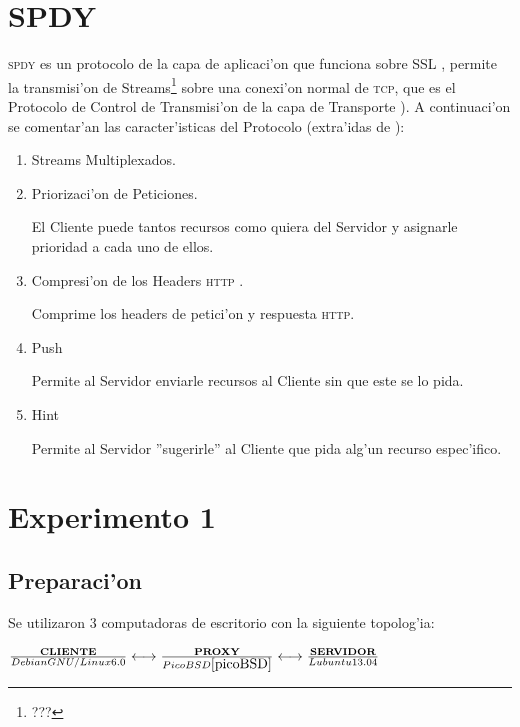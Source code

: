 \documentclass[a4paper,11pt,twocolumns]{article}
\begin{document}
\section{SPDY}

\textsc{spdy}\cite{SPDYWhitepaper} es un protocolo de la capa de aplicaci'on \cite{illustratedTCPIP} que funciona sobre SSL \cite{rfcSSL}, permite la transmisi'on de Streams\footnote{???} sobre una conexi'on normal de \textsc{tcp}, que es el Protocolo de Control de Transmisi'on de la capa de Transporte \cite{illustratedTCPIP}). A continuaci'on se comentar'an las caracter'isticas del Protocolo (extra'idas de \cite{SPDYWhitepaper}):

\begin{enumerate}

\item Streams Multiplexados.

\item Priorizaci'on de Peticiones.

El Cliente puede tantos recursos como quiera del Servidor y asignarle prioridad a cada uno de ellos.

\item Compresi'on de los Headers \textsc{http} \cite{headersHTTP}.

Comprime los headers de petici'on y respuesta \textsc{http}.

\item Push

Permite al Servidor enviarle recursos al Cliente sin que este se lo pida.

\item Hint

Permite al Servidor ''sugerirle'' al Cliente que pida alg'un recurso espec'ifico.

\end{enumerate}

\section{Experimento 1}

\subsection{Preparaci'on}

Se utilizaron 3 computadoras de escritorio con la siguiente topolog'ia:

\vspace*{1\baselineskip}
\begin{math}
\frac{\textbf{CLIENTE}}{Debian GNU/Linux 6.0} \longleftrightarrow \frac{\textbf{PROXY}}{PicoBSD \cite{picoBSD}}  \longleftrightarrow \frac{\textbf{SERVIDOR}}{Lubuntu 13.04} 
\end{math}
\end{document}
